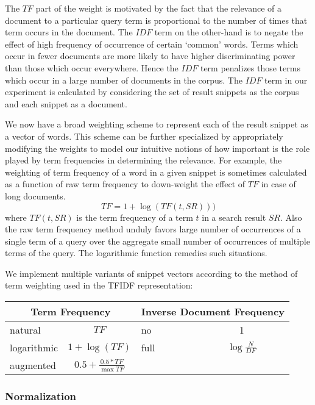 \documentclass[a4paper,12pt]{report}
\begin{document}
The $TF$ part of the weight is motivated by the fact that the
relevance of a document to a particular query term is proportional to
the number of times that term occurs in the document. The $IDF$ term
on the other-hand is to negate the effect of high frequency of
occurrence of certain `common' words. Terms which occur in fewer
documents are more likely to have higher discriminating power than
those which occur everywhere. Hence the $IDF$ term penalizes those
terms which occur in a large number of documents in the corpus. The
$IDF$ term in our experiment is calculated by considering the set of
result snippets as the corpus and each snippet as a document.

We now have a broad weighting scheme to represent each of the result
snippet as a vector of words. This scheme can be further specialized
by appropriately modifying the weights to model our intuitive notions
of how important is the role played by term frequencies in determining
the relevance. For example, the weighting of term frequency of a word
in a given snippet is sometimes calculated as a function of raw term
frequency to down-weight the effect of $TF$ in case of long documents.
$$ TF = 1 + \log (TF(t,SR)))$$ where $TF(t,SR)$ is the term frequency
of a term $t$ in a search result $SR$. Also the raw term frequency
method unduly favors large number of occurrences of a single term of a
query over the aggregate small number of occurrences of multiple terms
of the query. The logarithmic function remedies such
situations\cite{BSA93}.

We implement multiple variants of snippet vectors according to the
method of term weighting used in the TFIDF representation:

\begin{table}[h]
\centering
\begin{tabular} {|l | c || l | c|}
  \hline
  \multicolumn{2}{|c||}{Term Frequency} & \multicolumn{2}{|c|}{Inverse
    Document Frequency} \\
  \hline
  natural & $TF$ & no & 1 \\
  logarithmic & $1 + \log (TF)$ & full & $\log \frac{N}{DF}$ \\
  augmented & $0.5 + \frac{0.5 * TF}{\max TF}$ & & \\
  \hline
\end{tabular}
\end{table}

\subsubsection{Normalization}
\end{document}
